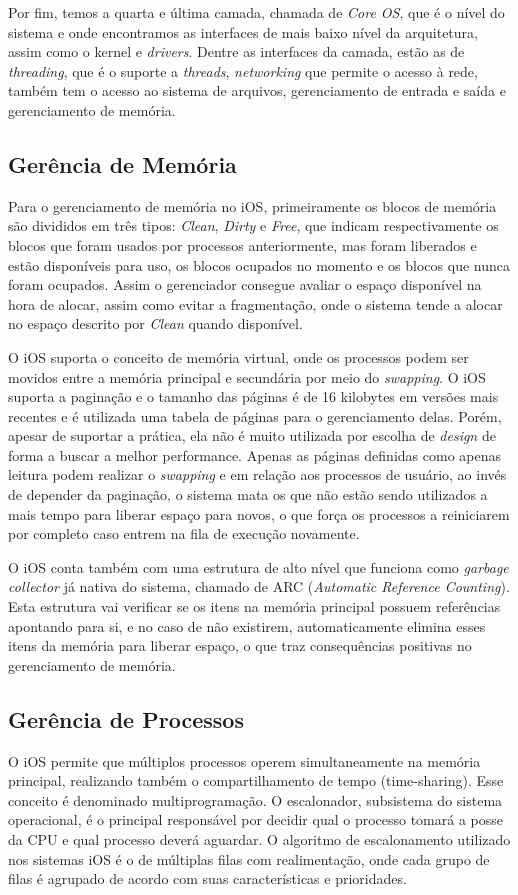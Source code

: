 \documentclass[conference]{IEEEtran}
\begin{document}
Por fim, temos a quarta e última camada, chamada de \textit{Core OS}, que é o nível do sistema e onde encontramos as interfaces de mais baixo nível da arquitetura, assim como o kernel e \textit{drivers}. Dentre as interfaces da camada, estão as de \textit{threading}, que é o suporte a \textit{threads}, \textit{networking} que permite o acesso à rede, também tem o acesso ao sistema de arquivos, gerenciamento de entrada e saída e gerenciamento de memória.

\subsection{Gerência de Memória}
Para o gerenciamento de memória no iOS, primeiramente os blocos de memória são divididos em três tipos: \textit{Clean}, \textit{Dirty} e \textit{Free}, que indicam respectivamente os blocos que foram usados por processos anteriormente, mas foram liberados e estão disponíveis para uso, os blocos ocupados no momento e os blocos que nunca foram ocupados. Assim o gerenciador consegue avaliar o espaço disponível na hora de alocar, assim como evitar a fragmentação, onde o sistema tende a alocar no espaço descrito por \textit{Clean} quando disponível.

O iOS suporta o conceito de memória virtual, onde os processos podem ser movidos entre a memória principal e secundária por meio do \textit{swapping}. O iOS suporta a paginação e o tamanho das páginas é de 16 kilobytes em versões mais recentes e é utilizada uma tabela de páginas para o gerenciamento delas. Porém, apesar de suportar a prática, ela não é muito utilizada por escolha de \textit{design} de forma a buscar a melhor performance. Apenas as páginas definidas como apenas leitura podem realizar o \textit{swapping} e em relação aos processos de usuário, ao invés de depender da paginação, o sistema mata os que não estão sendo utilizados a mais tempo para liberar espaço para novos, o que força os processos a reiniciarem por completo caso entrem na fila de execução novamente.

O iOS conta também com uma estrutura de alto nível que funciona como \textit{garbage collector} já nativa do sistema, chamado de ARC (\textit{Automatic Reference Counting}). Esta estrutura vai verificar se os itens na memória principal possuem referências apontando para si, e no caso de não existirem, automaticamente elimina esses itens da memória para liberar espaço, o que traz consequências positivas no gerenciamento de memória.

\subsection{Gerência de Processos}
O iOS permite que múltiplos processos operem simultaneamente na memória principal, realizando também o compartilhamento de tempo (time-sharing). Esse conceito é denominado multiprogramação. O escalonador, subsistema do sistema operacional, é o principal responsável por decidir qual o processo tomará a posse da CPU e qual processo deverá aguardar. O algoritmo de escalonamento utilizado nos sistemas iOS é o de múltiplas filas com realimentação, onde cada grupo de filas é agrupado de acordo com suas características e prioridades. 
\end{document}
